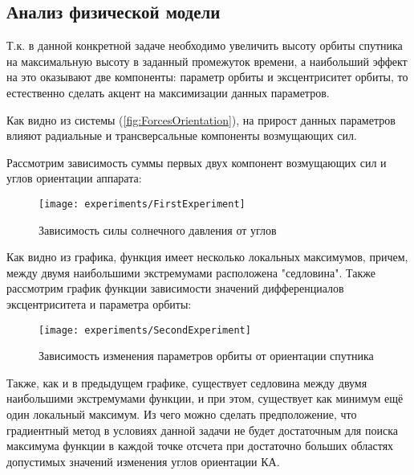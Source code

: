 \subsection{Анализ физической модели}
\noindent\indent Т.к. в данной конкретной задаче необходимо увеличить высоту орбиты
спутника на максимальную высоту в заданный промежуток времени, а наибольший эффект
на это оказывают две компоненты: параметр орбиты и эксцентриситет орбиты, то естественно
сделать акцент на максимизации данных параметров.\par
    Как видно из системы (\ref{fig:ForcesOrientation}), на прирост данных параметров
влияют радиальные и трансверсальные компоненты возмущающих сил.\par
    Рассмотрим зависимость суммы первых двух компонент возмущающих сил и углов ориентации аппарата:
\begin{figure}[h]
  \centering
  \texttt{[image: experiments/FirstExperiment]}
  \caption{Зависимость силы солнечного давления от углов}
  \label{fig:Force2Angles}
\end{figure}\par
    Как видно из графика, функция имеет несколько локальных максимумов, причем,
между двумя наибольшими экстремумами расположена "седловина". Также
рассмотрим график функции зависимости значений дифференциалов эксцентриситета и
параметра орбиты:
\begin{figure}[h]
  \centering
  \texttt{[image: experiments/SecondExperiment]}
  \caption{Зависимость изменения параметров орбиты от ориентации спутника}
  \label{fig:KeplerParams2Angles}
\end{figure}\par
    Также, как и в предыдущем графике, существует седловина между двумя наибольшими
экстремумами функции, и при этом, существует как минимум ещё один локальный максимум.
    Из чего можно сделать предположение, что градиентный метод в условиях данной
задачи не будет достаточным для поиска максимума функции в каждой точке отсчета
при достаточно больших областях допустимых значений изменения углов ориентации КА.

